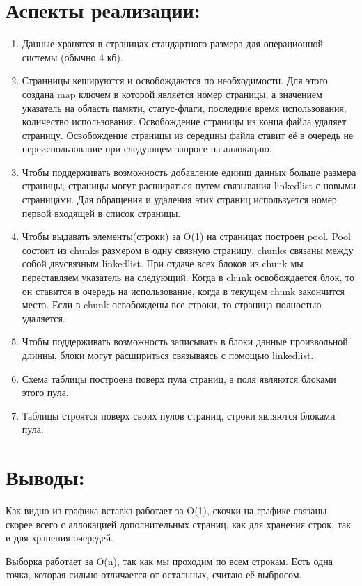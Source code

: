 \documentclass[12pt,onecolumn]{article}
\begin{document}
\section{Аспекты реализации:}
\begin{enumerate}
  \item Данные хранятся в страницах стандартного размера для операционной системы (обычно 4 кб). 
  \item Странницы кешируются и освобождаются по необходимости. Для этого создана map ключем в которой является номер страницы, а значением указатель на область памяти, статус-флаги, последние время использования, количество использования. Освобождение страницы из конца файла удаляет страницу. Освобождение страницы из середины файла ставит её в очередь не переиспользование при следующем запросе на аллокацию.
  \item Чтобы поддерживать возможность добавление единиц данных больше размера страницы, страницы могут расширяться путем связывания linkedlist с новыми страницами. Для обращения и удаления этих страниц используется номер первой входящей в список страницы.
  \item Чтобы выдавать элементы(строки) за O(1) на страницах построен pool. Pool состоит из chunks размером в одну связную страницу, chunks связаны между собой двусвязным linkedlist. При отдаче всех блоков из chunk мы переставляем указатель на следующий. Когда в chunk освобождается блок, то он ставится в очередь на использование, когда в текущем chunk закончится место. Если в chunk освобождены все строки, то страница полностью удаляется.
  \item Чтобы поддерживать возможность записывать в блоки данные произвольной длинны, блоки могут расшириться связываясь с помощью linkedlist.
  \item Схема таблицы построена поверх пула страниц, а поля являются блоками этого пула.
  \item Таблицы строятся поверх своих пулов страниц, строки являются блоками пула.
\end{enumerate}
\section{Выводы:}
Как видно из графика вставка работает за O(1), скочки на графике связаны скорее всего с аллокацией дополнительных страниц, как для хранения строк, так и для хранения очередей. 

Выборка работает за O(n), так как мы проходим по всем строкам. Есть одна точка, которая сильно отличается от остальных, считаю её выбросом.
\end{document}
